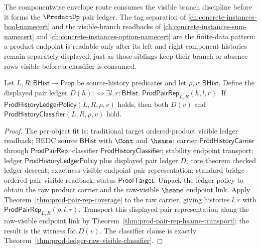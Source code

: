 The componentwise envelope route consumes the visible branch discipline before it forms the $\ProductUp$ pair ledger. The tag separation of \autoref{ch:concrete-instances-bool-namecert} and the visible-branch readbacks of \autoref{ch:concrete-instances-sum-namecert} and \autoref{ch:concrete-instances-option-namecert} are the finite-data pattern: a product endpoint is readable only after its left and right component histories remain separately displayed, just as those siblings keep their branch or absence rows visible before a classifier is consumed.

\begin{theorem}
\label{thm:prod-ledger-visible-pair-representation-readback}
Let $L,R:\mathsf{BHist}\to\mathsf{Prop}$ be source-history predicates and let
$\rho,v:\mathsf{BHist}$. Define the displayed pair ledger
$D(h):\Longleftrightarrow
\exists l,r:\mathsf{BHist}.\;\mathsf{ProdPairRep}_{L,R}(h,l,r)$.
If $\mathsf{ProdHistoryLedgerPolicy}(L,R,\rho,v)$ holds, then both
$D(v)$ and $\mathsf{ProdHistoryClassifier}(L,R,\rho,v)$ hold.
\end{theorem}
\begin{proof}
The per-object fit is: traditional target ordered-product visible ledger
readback; BEDC source $\mathsf{BHist}$ with $\Cont$ and $\hsame$; carrier
$\mathsf{ProdHistoryCarrier}$ through $\mathsf{ProdPairRep}$; classifier
$\mathsf{ProdHistoryClassifier}$; stability endpoint transport; ledger
$\mathsf{ProdHistoryLedgerPolicy}$ plus displayed pair ledger $D$; core theorem
checked ledger descent; exactness visible endpoint pair representation; standard
bridge ordered-pair visible readback; status $\mathsf{ProofTarget}$. Unpack the
ledger policy to obtain the raw product carrier and the raw-visible $\hsame$
endpoint link. Apply
Theorem~\ref{thm:prod-pair-rep-coverage} to the raw carrier, giving histories
$l,r$ with $\mathsf{ProdPairRep}_{L,R}(\rho,l,r)$. Transport this displayed pair
representation along the raw-visible endpoint link by
Theorem~\ref{thm:prod-pair-rep-hsame-transport}; the result is the witness for
$D(v)$. The classifier clause is exactly
Theorem~\ref{thm:prod-ledger-raw-visible-classifier}.
\end{proof}

